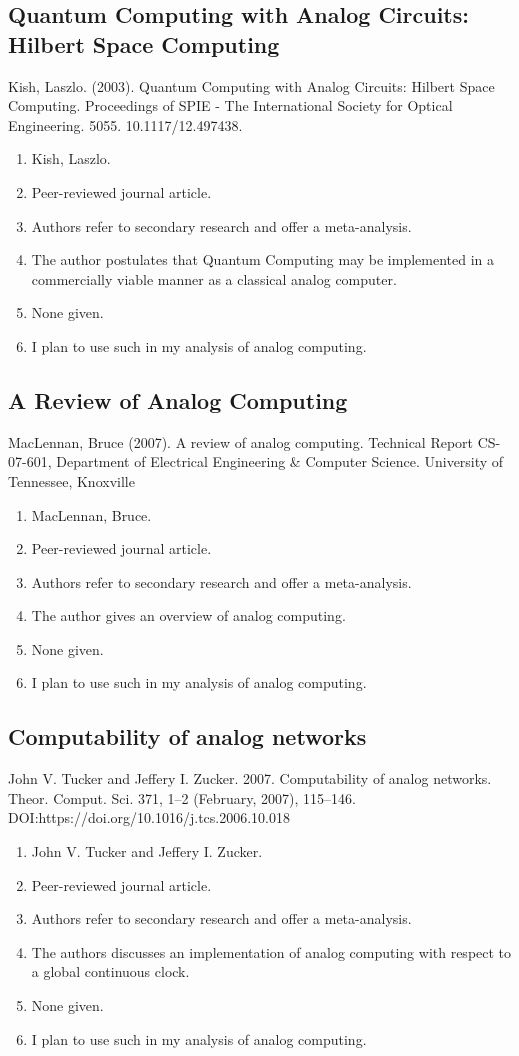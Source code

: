 \subsection*{Quantum Computing with Analog Circuits: Hilbert Space Computing}
Kish, Laszlo. (2003). Quantum Computing with Analog Circuits: Hilbert Space Computing. Proceedings of SPIE - The International Society for Optical Engineering. 5055. 10.1117/12.497438. 
\begin{enumerate}
    \item Kish, Laszlo.
    \item Peer-reviewed journal article.
    \item Authors refer to secondary research and offer a meta-analysis.
    \item The author postulates that Quantum Computing may be implemented in a commercially viable manner as a classical analog computer. 
    \item None given. 
    \item I plan to use such in my analysis of analog computing. 
\end{enumerate}

\subsection*{A Review of Analog Computing}
MacLennan, Bruce (2007). A review of analog computing. Technical Report CS-07-601, Department of Electrical Engineering \& Computer Science. University of Tennessee, Knoxville
\begin{enumerate}
    \item MacLennan, Bruce.
    \item Peer-reviewed journal article.
    \item Authors refer to secondary research and offer a meta-analysis.
    \item The author gives an overview of analog computing.
    \item None given. 
    \item I plan to use such in my analysis of analog computing. 
\end{enumerate}

\subsection*{Computability of analog networks}
John V. Tucker and Jeffery I. Zucker. 2007. Computability of analog networks. Theor. Comput. Sci. 371, 1–2 (February, 2007), 115–146. DOI:https://doi.org/10.1016/j.tcs.2006.10.018
\begin{enumerate}
    \item John V. Tucker and Jeffery I. Zucker.
    \item Peer-reviewed journal article.
    \item Authors refer to secondary research and offer a meta-analysis.
    \item The authors discusses an implementation of analog computing with respect to a global continuous clock.
    \item None given. 
    \item I plan to use such in my analysis of analog computing. 
\end{enumerate}

